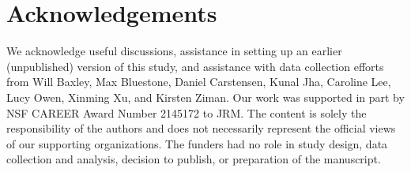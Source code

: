 \documentclass[10pt]{article}
\begin{document}
\section*{Acknowledgements}

We acknowledge useful discussions, assistance in setting up an earlier
(unpublished) version of this study, and assistance with data
collection efforts from Will Baxley, Max Bluestone, Daniel Carstensen, Kunal
Jha, Caroline Lee, Lucy Owen, Xinming Xu, and Kirsten Ziman. Our work was
supported in part by NSF CAREER Award Number 2145172 to JRM. The content is
solely the responsibility of the authors and does not necessarily represent the
official views of our supporting organizations. The funders had no role in
study design, data collection and analysis, decision to publish, or preparation
of the manuscript.





\end{document}
